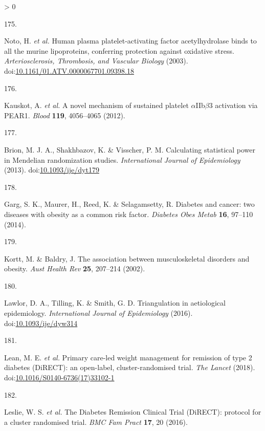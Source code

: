 \documentclass[11pt,twoside]{bristolthesis}
\newlength{\cslhangindent}
\newlength{\csllabelwidth}
\newenvironment{CSLReferences}[2] %
 {%
  \setlength{\parindent}{0pt}
  \ifodd #1 \everypar{\setlength{\hangindent}{\cslhangindent}}\ignorespaces\fi
  \ifnum #2 > 0
  \setlength{\parskip}{#2\baselineskip}
  \fi
 }%
 {}
\newcommand{\CSLLeftMargin}[1]{\parbox[t]{\csllabelwidth}{#1}}
\newcommand{\CSLRightInline}[1]{\parbox[t]{\linewidth - \csllabelwidth}{#1}\break}
\begin{document}
\begin{CSLReferences}{0}{0}
\leavevmode\hypertarget{ref-Noto2003}{}%
\CSLLeftMargin{175. }
\CSLRightInline{Noto, H. \emph{et al.} {Human plasma platelet-activating factor acetylhydrolase binds to all the murine lipoproteins, conferring protection against oxidative stress}. \emph{Arteriosclerosis, Thrombosis, and Vascular Biology} (2003). doi:\href{https://doi.org/10.1161/01.ATV.0000067701.09398.18}{10.1161/01.ATV.0000067701.09398.18}}

\leavevmode\hypertarget{ref-Kauskot2012}{}%
\CSLLeftMargin{176. }
\CSLRightInline{Kauskot, A. \emph{et al.} {A novel mechanism of sustained platelet \(\alpha\)IIb\(\beta\)3 activation via PEAR1.} \emph{Blood} \textbf{119}, 4056--4065 (2012).}

\leavevmode\hypertarget{ref-Brion2013}{}%
\CSLLeftMargin{177. }
\CSLRightInline{Brion, M. J. A., Shakhbazov, K. \& Visscher, P. M. {Calculating statistical power in Mendelian randomization studies}. \emph{International Journal of Epidemiology} (2013). doi:\href{https://doi.org/10.1093/ije/dyt179}{10.1093/ije/dyt179}}

\leavevmode\hypertarget{ref-Garg2014}{}%
\CSLLeftMargin{178. }
\CSLRightInline{Garg, S. K., Maurer, H., Reed, K. \& Selagamsetty, R. {Diabetes and cancer: two diseases with obesity as a common risk factor}. \emph{Diabetes Obes Metab} \textbf{16}, 97--110 (2014).}

\leavevmode\hypertarget{ref-Kortt2002}{}%
\CSLLeftMargin{179. }
\CSLRightInline{Kortt, M. \& Baldry, J. {The association between musculoskeletal disorders and obesity}. \emph{Aust Health Rev} \textbf{25}, 207--214 (2002).}

\leavevmode\hypertarget{ref-Lawlor2016}{}%
\CSLLeftMargin{180. }
\CSLRightInline{Lawlor, D. A., Tilling, K. \& Smith, G. D. {Triangulation in aetiological epidemiology}. \emph{International Journal of Epidemiology} (2016). doi:\href{https://doi.org/10.1093/ije/dyw314}{10.1093/ije/dyw314}}

\leavevmode\hypertarget{ref-Lean2018}{}%
\CSLLeftMargin{181. }
\CSLRightInline{Lean, M. E. \emph{et al.} {Primary care-led weight management for remission of type 2 diabetes (DiRECT): an open-label, cluster-randomised trial}. \emph{The Lancet} (2018). doi:\href{https://doi.org/10.1016/S0140-6736(17)33102-1}{10.1016/S0140-6736(17)33102-1}}

\leavevmode\hypertarget{ref-Leslie2016}{}%
\CSLLeftMargin{182. }
\CSLRightInline{Leslie, W. S. \emph{et al.} {The Diabetes Remission Clinical Trial (DiRECT): protocol for a cluster randomised trial}. \emph{BMC Fam Pract} \textbf{17}, 20 (2016).}


\end{CSLReferences}
\end{document}
